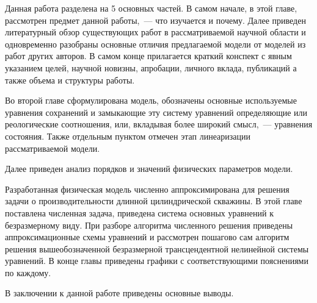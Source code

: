 
{\actuality} Данная работа разделена на 5 основных частей. В самом начале, в этой главе, рассмотрен предмет данной работы,~--- что изучается и почему. Далее приведен литературный обзор существующих работ в рассматриваемой научной области и одновременно разобраны основные отличия предлагаемой модели от моделей из работ других авторов. В самом конце прилагается краткий конспект с явным указанием целей, научной новизны, апробации, личного вклада, публикаций а также объема и структуры работы.

Во второй главе сформулирована модель, обозначены основные используемые уравнения сохранений и замыкающие эту систему уравнений определяющие или реологические соотношения, или, вкладывая более широкий смысл,~--- уравнения состояния. Также отдельным пунктом отмечен этап линеаризации рассматриваемой модели.

Далее приведен анализ порядков и значений физических параметров модели.

Разработанная физическая модель численно аппроксимирована для решения задачи о производительности длинной цилиндрической скважины. В этой главе поставлена численная задача, приведена система основных уравнений к безразмерному виду. При разборе алгоритма численного решения приведены аппроксимационные схемы уравнений и рассмотрен пошагово сам алгоритм решения вышеобозначенной безразмерной трансцендентной нелинейной системы уравнений. В конце главы приведены графики с соответствующими пояснениями по каждому.

В заключении к данной работе приведены основные выводы.

